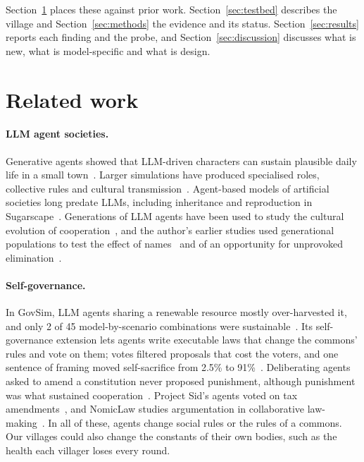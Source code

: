\documentclass[11pt]{article}
\begin{document}
Section~\ref{sec:related} places these against prior work. Section~\ref{sec:testbed} describes the
village and Section~\ref{sec:methods} the evidence and its status. Section~\ref{sec:results} reports
each finding and the probe, and Section~\ref{sec:discussion} discusses what is new, what is
model-specific and what is design.

\section{Related work}\label{sec:related}

\paragraph{LLM agent societies.} Generative agents showed that LLM-driven characters can sustain
plausible daily life in a small town~\citep{park2023generative}. Larger simulations have produced
specialised roles, collective rules and cultural transmission~\citep{altera2024sid}. Agent-based
models of artificial societies long predate LLMs, including inheritance and reproduction in
Sugarscape~\citep{epstein1996growing}. Generations of LLM agents have been used to study the
cultural evolution of cooperation~\citep{vallinder2024cultural}, and the author's earlier studies
used generational populations to test the effect of names~\citep{wynnejones2026names} and of an
opportunity for unprovoked elimination~\citep{wynnejones2026resist}.

\paragraph{Self-governance.} In GovSim, LLM agents sharing a renewable resource mostly
over-harvested it, and only 2 of 45 model-by-scenario combinations were
sustainable~\citep{piatti2024cooperate}. Its self-governance extension lets agents write executable
laws that change the commons' rules and vote on them; votes filtered proposals that cost the voters,
and one sentence of framing moved self-sacrifice from 2.5\% to 91\%~\citep{rehm2026selfgovern}.
Deliberating agents asked to amend a constitution never proposed punishment, although punishment was
what sustained cooperation~\citep{niranjani2026internal}. Project Sid's agents voted on tax
amendments~\citep{altera2024sid}, and NomicLaw studies argumentation in collaborative
law-making~\citep{hota2025nomiclaw}. In all of these, agents change social rules or the rules of a
commons. Our villages could also change the constants of their own bodies, such as the health each
villager loses every round.
\end{document}
